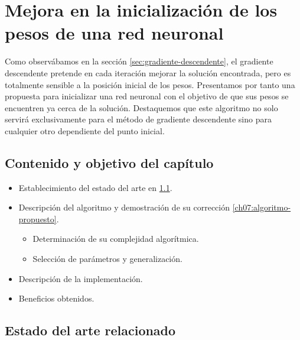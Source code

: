 \chapter{ Mejora en la inicialización de los pesos de una red neuronal}  
\label{section:inicializar_pesos}

Como observábamos en la sección \ref{sec:gradiente-descendente}, el gradiente descendente pretende en cada 
iteración mejorar la solución encontrada, pero es 
totalmente sensible a la posición inicial 
de los pesos. 
Presentamos por tanto una propuesta para 
inicializar una red neuronal con el objetivo de que 
sus pesos se encuentren ya cerca de la solución. 
Destaquemos que este algoritmo 
no solo servirá exclusivamente para el método de gradiente descendente 
sino para cualquier otro dependiente del punto inicial. 

\section*{Contenido y objetivo del capítulo}  

\begin{itemize}
    \item Establecimiento del estado del arte en \ref{ch07:estado-arte}.
    \item Descripción del algoritmo y demostración de su corrección \ref{ch07:algoritmo-propuesto}.
    \begin{itemize}
        \item Determinación de su complejidad algorítmica. 
        \item Selección de parámetros y generalización. 
    \end{itemize}
    \item Descripción de la implementación. 
    \item Beneficios obtenidos.  
\end{itemize}



\section{ Estado del arte relacionado } 
\label{ch07:estado-arte}
\setlength{\marginparwidth}{\bigMarginSize}

